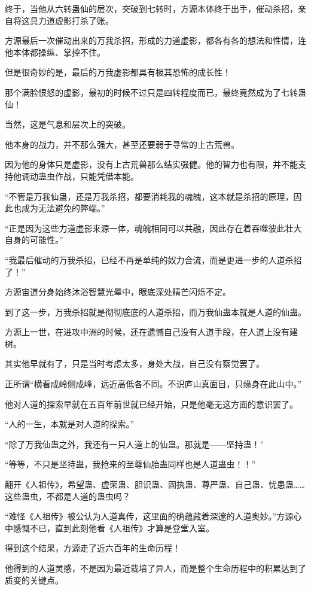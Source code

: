 \begin{this_body}
终于，当他从六转蛊仙的层次，突破到七转时，方源本体终于出手，催动杀招，亲自将这具力道虚影打杀了账。

方源最后一次催动出来的万我杀招，形成的力道虚影，都各有各的想法和性情，连他本体都操纵、掌控不住。

但是很奇妙的是，最后的万我虚影都具有极其恐怖的成长性！

那个满脸恨怒的虚影，最初的时候不过只是四转程度而已，最终竟然成为了七转蛊仙！

当然，这是气息和层次上的突破。

他本身的战力，并不那么强大，甚至还要弱于寻常的上古荒兽。

因为他的身体只是虚影，没有上古荒兽那么结实强健。他的智力也有限，并不能支持他调动蛊虫作战，只能凭借本能。

“不管是万我仙蛊，还是万我杀招，都要消耗我的魂魄，这本就是杀招的原理，因此也成为无法避免的弊端。”

“正是因为这些力道虚影来源一体，魂魄相同可以共融，因此存在着吞噬彼此壮大自身的可能性。”

“我最后催动的万我杀招，已经不再是单纯的奴力合流，而是更进一步的人道杀招了！”

方源宙道分身始终沐浴智慧光晕中，眼底深处精芒闪烁不定。

到了这一步，万我杀招就是彻彻底底的人道杀招，而万我仙蛊本就是人道的仙蛊。

方源上一世，在进攻中洲的时候，还在遗憾自己没有人道手段，在人道上没有建树。

其实他早就有了，只是当时考虑太多，身处大战，自己没有察觉罢了。

正所谓“横看成岭侧成峰，远近高低各不同。不识庐山真面目，只缘身在此山中。”

他对人道的探索早就在五百年前世就已经开始，只是他毫无这方面的意识罢了。

“人的一生，本就是对人道的探索。”

“除了万我仙蛊之外，我还有一只人道上的仙蛊。那就是——坚持蛊！”

“等等，不只是坚持蛊，我抢来的至尊仙胎蛊同样也是人道蛊虫！！”

翻开《人祖传》，希望蛊、虚荣蛊、胆识蛊、固执蛊、尊严蛊、自己蛊、忧患蛊……这些蛊虫，不都是人道的蛊虫吗？

“难怪《人祖传》被公认为人道真传，这里面的确蕴藏着深邃的人道奥妙。”方源心中感慨不已，直到此刻他看《人祖传》才算是登堂入室。

得到这个结果，方源走了近六百年的生命历程！

他得到的人道灵感，不是因为最近栽培了异人，而是整个生命历程中的积累达到了质变的关键点。


\end{this_body}
